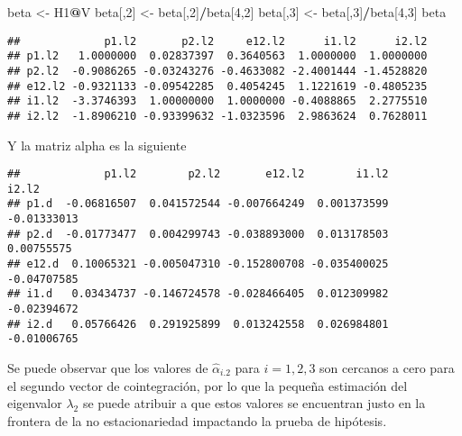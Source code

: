 \documentclass[]{book}
\newenvironment{Shaded}{\begin{snugshade}}{\end{snugshade}}
\newcommand{\KeywordTok}[1]{\textcolor[rgb]{0.13,0.29,0.53}{\textbf{#1}}}
\newcommand{\DecValTok}[1]{\textcolor[rgb]{0.00,0.00,0.81}{#1}}
\newcommand{\StringTok}[1]{\textcolor[rgb]{0.31,0.60,0.02}{#1}}
\newcommand{\OperatorTok}[1]{\textcolor[rgb]{0.81,0.36,0.00}{\textbf{#1}}}
\newcommand{\NormalTok}[1]{#1}
\theoremstyle{definition}
\theoremstyle{definition}
\theoremstyle{definition}
\theoremstyle{remark}
\begin{document}
\begin{Shaded}
\begin{Highlighting}[]
\NormalTok{beta <-}\StringTok{ }\NormalTok{H1}\OperatorTok{@}\NormalTok{V}
\NormalTok{beta[,}\DecValTok{2}\NormalTok{] <-}\StringTok{ }\NormalTok{beta[,}\DecValTok{2}\NormalTok{]}\OperatorTok{/}\NormalTok{beta[}\DecValTok{4}\NormalTok{,}\DecValTok{2}\NormalTok{]}
\NormalTok{beta[,}\DecValTok{3}\NormalTok{] <-}\StringTok{ }\NormalTok{beta[,}\DecValTok{3}\NormalTok{]}\OperatorTok{/}\NormalTok{beta[}\DecValTok{4}\NormalTok{,}\DecValTok{3}\NormalTok{]}
\NormalTok{beta}
\end{Highlighting}
\end{Shaded}

\begin{verbatim}
##             p1.l2       p2.l2     e12.l2      i1.l2      i2.l2
## p1.l2   1.0000000  0.02837397  0.3640563  1.0000000  1.0000000
## p2.l2  -0.9086265 -0.03243276 -0.4633082 -2.4001444 -1.4528820
## e12.l2 -0.9321133 -0.09542285  0.4054245  1.1221619 -0.4805235
## i1.l2  -3.3746393  1.00000000  1.0000000 -0.4088865  2.2775510
## i2.l2  -1.8906210 -0.93399632 -1.0323596  2.9863624  0.7628011
\end{verbatim}

Y la matriz alpha es la siguiente

\begin{Shaded}
\end{Shaded}

\begin{verbatim}
##             p1.l2        p2.l2       e12.l2        i1.l2       i2.l2
## p1.d  -0.06816507  0.041572544 -0.007664249  0.001373599 -0.01333013
## p2.d  -0.01773477  0.004299743 -0.038893000  0.013178503  0.00755575
## e12.d  0.10065321 -0.005047310 -0.152800708 -0.035400025 -0.04707585
## i1.d   0.03434737 -0.146724578 -0.028466405  0.012309982 -0.02394672
## i2.d   0.05766426  0.291925899  0.013242558  0.026984801 -0.01006765
\end{verbatim}

Se puede observar que los valores de \(\hat{\alpha}_{i.2}\) para
\(i=1,2,3\) son cercanos a cero para el segundo vector de cointegración,
por lo que la pequeña estimación del eigenvalor \(\lambda_2\) se puede
atribuir a que estos valores se encuentran justo en la frontera de la no
estacionariedad impactando la prueba de hipótesis.
\end{document}
